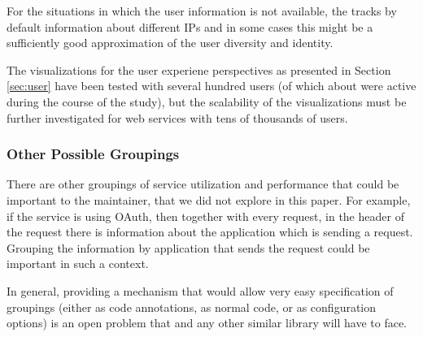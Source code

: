     For the situations in which the user information is not available, the \tool tracks by default information about different IPs and in some cases this might be a sufficiently good approximation of the user diversity and identity. 

    The visualizations for the user experiene perspectives as presented in Section \ref{sec:user} have been tested with several hundred users (of which about \activeUserCount were active during the course of the study), but the scalability of the visualizations must be further investigated for web services with tens of thousands of users.


  \subsubsection{Other Possible Groupings}

    There are other groupings of service utilization and performance that could be important to the maintainer, that we did not explore in this paper. For example, if the service is using OAuth, then together with every request, in the header of the request there is information about the application which is sending a request. Grouping the information by application that sends the request could be important in such a context. 

    In general, providing a mechanism that would allow very easy specification of groupings (either as code annotations, as normal code, or as configuration options) is an open problem that \tool and any other similar library will have to face.

